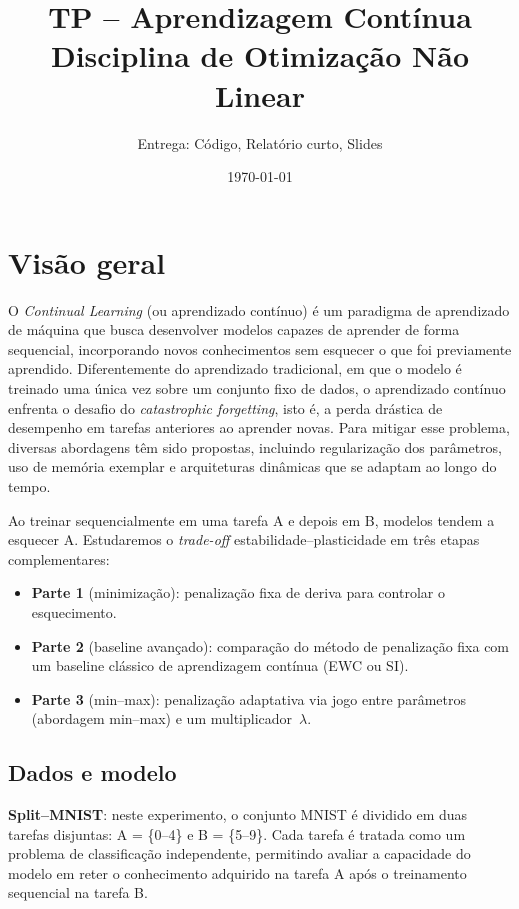 \documentclass[9pt,a4paper]{extarticle}
\title{\textbf{TP -- Aprendizagem Contínua}\\\large Disciplina de Otimização Não Linear}
\author{Entrega: Código, Relatório curto, Slides}
\date{\today}
\begin{document}
\maketitle

\section{Visão geral}
O \textit{Continual Learning} (ou aprendizado contínuo) é um paradigma de aprendizado de máquina que busca desenvolver modelos capazes de aprender de forma sequencial, incorporando novos conhecimentos sem esquecer o que foi previamente aprendido. Diferentemente do aprendizado tradicional, em que o modelo é treinado uma única vez sobre um conjunto fixo de dados, o aprendizado contínuo enfrenta o desafio do \textit{catastrophic forgetting}, isto é, a perda drástica de desempenho em tarefas anteriores ao aprender novas. Para mitigar esse problema, diversas abordagens têm sido propostas, incluindo regularização dos parâmetros, uso de memória exemplar e arquiteturas dinâmicas que se adaptam ao longo do tempo.

Ao treinar sequencialmente em uma tarefa A e depois em B, modelos tendem a esquecer A. Estudaremos o \emph{trade-off} estabilidade--plasticidade em três etapas complementares:
\begin{itemize}
  \item \textbf{Parte 1} (minimização): penalização fixa de deriva para controlar o esquecimento.
  \item \textbf{Parte 2} (baseline avançado): comparação do método de penalização fixa com um baseline clássico de aprendizagem contínua (EWC ou SI).
  \item \textbf{Parte 3} (min--max): penalização adaptativa via jogo entre parâmetros (abordagem min--max) e um multiplicador~$\lambda$.
\end{itemize}

\subsection{Dados e modelo}

\textbf{Split--MNIST}: neste experimento, o conjunto MNIST é dividido em duas tarefas disjuntas: 
A = \{0--4\} e B = \{5--9\}. Cada tarefa é tratada como um problema de classificação independente, 
permitindo avaliar a capacidade do modelo em reter o conhecimento adquirido na tarefa A 
após o treinamento sequencial na tarefa B.  
\end{document}
